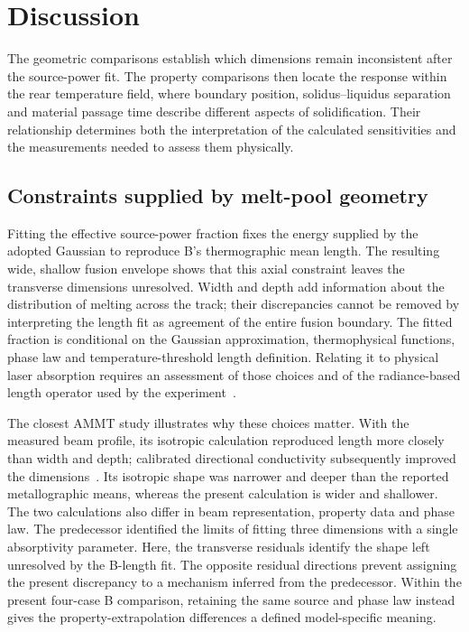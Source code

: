 \section{Discussion}
\label{sec:discussion}
The geometric comparisons establish which dimensions remain inconsistent after the source-power fit. The property comparisons then locate the response within the rear temperature field, where boundary position, solidus--liquidus separation and material passage time describe different aspects of solidification. Their relationship determines both the interpretation of the calculated sensitivities and the measurements needed to assess them physically.

\subsection{Constraints supplied by melt-pool geometry}
Fitting the effective source-power fraction fixes the energy supplied by the adopted Gaussian to reproduce B's thermographic mean length. The resulting wide, shallow fusion envelope shows that this axial constraint leaves the transverse dimensions unresolved. Width and depth add information about the distribution of melting across the track; their discrepancies cannot be removed by interpreting the length fit as agreement of the entire fusion boundary. The fitted fraction is conditional on the Gaussian approximation, thermophysical functions, phase law and temperature-threshold length definition. Relating it to physical laser absorption requires an assessment of those choices and of the radiance-based length operator used by the experiment~\cite{lane2020}.

The closest AMMT study illustrates why these choices matter. With the measured beam profile, its isotropic calculation reproduced length more closely than width and depth; calibrated directional conductivity subsequently improved the dimensions~\cite{kollmannsberger2019}. Its isotropic shape was narrower and deeper than the reported metallographic means, whereas the present calculation is wider and shallower. The two calculations also differ in beam representation, property data and phase law. The predecessor identified the limits of fitting three dimensions with a single absorptivity parameter. Here, the transverse residuals identify the shape left unresolved by the B-length fit. The opposite residual directions prevent assigning the present discrepancy to a mechanism inferred from the predecessor. Within the present four-case B comparison, retaining the same source and phase law instead gives the property-extrapolation differences a defined model-specific meaning.

